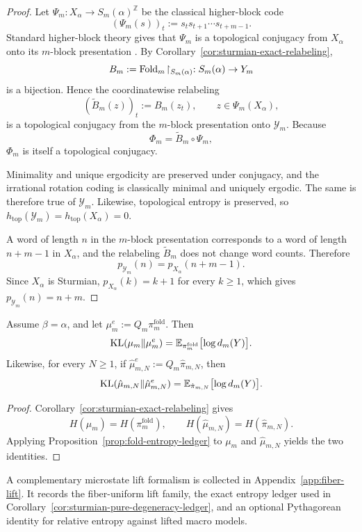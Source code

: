 \begin{proof}
Let \(\Psi_m:X_\alpha\to S_m(\alpha)^{\mathbb{Z}}\) be the classical higher-block
code
\[
(\Psi_m(s))_t:=s_t s_{t+1}\cdots s_{t+m-1}.
\]
Standard higher-block theory gives that \(\Psi_m\) is a topological conjugacy
from \(X_\alpha\) onto its \(m\)-block presentation
\cite{LindMarcus1995}. By Corollary~\ref{cor:sturmian-exact-relabeling},
\[
B_m:=\mathrm{Fold}_m\!\upharpoonright_{S_m(\alpha)}:S_m(\alpha)\to Y_m
\]
is a bijection. Hence the coordinatewise relabeling
\[
(\widetilde B_m(z))_t:=B_m(z_t),
\qquad z\in \Psi_m(X_\alpha),
\]
is a topological conjugacy from the \(m\)-block presentation onto
\(\mathcal{Y}_m\).
Because
\[
\Phi_m=\widetilde B_m\circ \Psi_m,
\]
\(\Phi_m\) is itself a topological conjugacy.

Minimality and unique ergodicity are preserved under conjugacy, and the
irrational rotation coding is classically minimal and uniquely ergodic. The
same is therefore true of \(\mathcal{Y}_m\). Likewise, topological entropy is
preserved, so \(h_{\mathrm{top}}(\mathcal{Y}_m)=h_{\mathrm{top}}(X_\alpha)=0\).

A word of length \(n\) in the \(m\)-block presentation corresponds to a word of
length \(n+m-1\) in \(X_\alpha\), and the relabeling \(\widetilde B_m\) does
not change word counts. Therefore
\[
p_{\mathcal{Y}_m}(n)=p_{X_\alpha}(n+m-1).
\]
Since \(X_\alpha\) is Sturmian, \(p_{X_\alpha}(k)=k+1\) for every \(k\ge 1\),
which gives \(p_{\mathcal{Y}_m}(n)=n+m\).
\end{proof}

\begin{corollary}\label{cor:sturmian-pure-degeneracy-ledger}
Assume \(\beta=\alpha\), and let \(\mu_m^e:=Q_m\pi_m^{\mathrm{fold}}\). Then
\[
\operatorname{KL}(\mu_m\|\mu_m^e)
=
\mathbb{E}_{\pi_m^{\mathrm{fold}}}\bigl[\log d_m(Y)\bigr].
\]
Likewise, for every \(N\ge 1\), if \(\hat\mu_{m,N}^e:=Q_m\hat\pi_{m,N}\), then
\[
\operatorname{KL}(\hat\mu_{m,N}\|\hat\mu_{m,N}^e)
=
\mathbb{E}_{\hat\pi_{m,N}}\bigl[\log d_m(Y)\bigr].
\]
\end{corollary}

\begin{proof}
Corollary~\ref{cor:sturmian-exact-relabeling} gives
\[
H(\mu_m)=H(\pi_m^{\mathrm{fold}}),
\qquad
H(\hat\mu_{m,N})=H(\hat\pi_{m,N}).
\]
Applying Proposition~\ref{prop:fold-entropy-ledger} to \(\mu_m\) and
\(\hat\mu_{m,N}\) yields the two identities.
\end{proof}

A complementary microstate lift formalism is collected in
Appendix~\ref{app:fiber-lift}. It records the fiber-uniform lift family, the
exact entropy ledger used in Corollary~\ref{cor:sturmian-pure-degeneracy-ledger},
and an optional Pythagorean identity for relative entropy against lifted macro
models.
